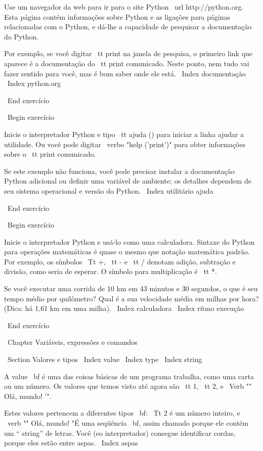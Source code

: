\documentclass[10pt]{book}
\begin{document}
\begin {itemize}
{Use um navegador da web para ir para o site Python \ url {http://python.org}.
Esta página contém informações sobre Python e as ligações
para páginas relacionadas com o Python, e dá-lhe a capacidade de pesquisar
a documentação do Python.

Por exemplo, se você digitar {\ tt print} na janela de pesquisa, o
primeiro link que aparece é a documentação do {\ tt print}
comunicado. Neste ponto, nem tudo vai fazer sentido para você,
mas é bom saber onde ele está.
\ Index {} documentação
\ Index {} python.org

\ End {} exercício

\ Begin {} exercício

Inicie o interpretador Python e tipo {\ tt ajuda ()} para iniciar a linha
ajudar a utilidade. Ou você pode digitar \ verbo "help ('print')" para obter informações
sobre o {\ tt print} comunicado.

Se este exemplo não funciona, você
pode precisar instalar a documentação Python adicional ou definir uma
variável de ambiente; os detalhes dependem de seu sistema operacional e
versão do Python.
\ Index {utilitário ajuda}

\ End {} exercício

\ Begin {} exercício

Inicie o interpretador Python e usá-lo como uma calculadora.
Sintaxe do Python para operações matemáticas é quase o mesmo que
notação matemática padrão. Por exemplo, os símbolos
{\ Tt +}, {\ tt -} e {\ tt /} denotam adição, subtração
e divisão, como seria de esperar. O símbolo para
multiplicação é {\ tt *}.

Se você executar uma corrida de 10 km em 43 minutos e 30 segundos, o que é seu
tempo médio por quilômetro? Qual é a sua velocidade média em milhas por hora?
(Dica: há 1,61 km em uma milha).
\ Index {calculadora}
\ Index {ritmo execução}

\ End {} exercício




\ Chapter {Variáveis, expressões e comandos}

\ Section {Valores e tipos}
\ Index {value}
\ Index {type}
\ Index {string}

A {value \ bf} é uma das coisas básicas de um programa trabalha,
como uma carta ou um
número. Os valores que temos visto até agora
são {\ tt 1}, {\ tt 2}, e
\ Verb "" Olá, mundo! '".

Estes valores pertencem a diferentes tipos {\ bf}:
{\ Tt 2} é um número inteiro, e \ verb "" Olá, mundo! "É uma seqüência {\ bf},
assim chamado porque ele contém um `` string'' de letras.
Você (eo interpretador) consegue identificar
cordas, porque eles estão entre aspas.
\ Index {aspas}

}
\end{itemize}
\end{document}
